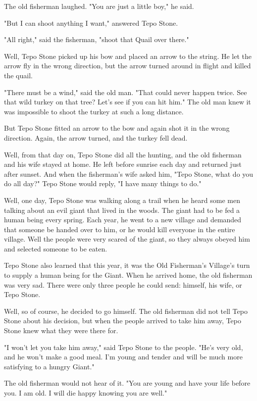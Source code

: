 The old fisherman laughed. "You are just a little boy," he said.

"But I can shoot anything I want," answered Tepo Stone.

"All right," said the fisherman, "shoot that Quail over there."

Well, Tepo Stone picked up his bow and placed an arrow to the string. He let the arrow fly in the wrong direction, but the arrow turned around in flight and killed the quail.

"There must be a wind," said the old man. "That could never happen twice. See that wild turkey on that tree? Let's see if you can hit him." The old man knew it was impossible to shoot the turkey at such a long distance.

But Tepo Stone fitted an arrow to the bow and again shot it in the wrong direction. Again, the arrow turned, and the turkey fell dead.

Well, from that day on, Tepo Stone did all the hunting, and the old fisherman and his wife stayed at home. He left before sunrise each day and returned just after sunset. And when the fisherman's wife asked him, "Tepo Stone, what do you do all day?" Tepo Stone would reply, "I have many things to do."

Well, one day, Tepo Stone was walking along a trail when he heard some men talking about an evil giant that lived in the woods. The giant had to be fed a human being every spring. Each year, he went to a new village and demanded that someone be handed over to him, or he would kill everyone in the entire village. Well the people were very scared of the giant, so they always obeyed him and selected someone to be eaten.

Tepo Stone also learned that this year, it was the Old Fisherman's Village's turn to supply a human being for the Giant. When he arrived home, the old fisherman was very sad. There were only three people he could send: himself, his wife, or Tepo Stone.

Well, so of course, he decided to go himself. The old fisherman did not tell Tepo Stone about his decision, but when the people arrived to take him away, Tepo Stone knew what they were there for.

"I won't let you take him away," said Tepo Stone to the people. "He's very old, and he won't make a good meal. I'm young and tender and will be much more satisfying to a hungry Giant."

The old fisherman would not hear of it. "You are young and have your life before you. I am old. I will die happy knowing you are well."

